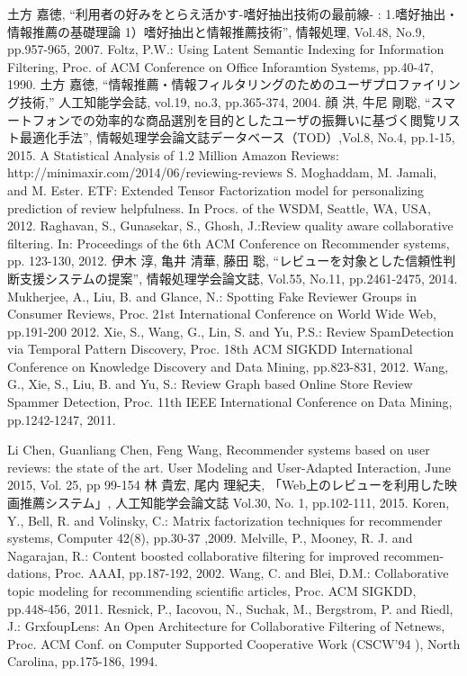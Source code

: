 \documentclass[a4paper,11pt,oneside,openany]{jsbook}
\begin{document}
\begin{thebibliography}{99}
	土方 嘉徳, “利用者の好みをとらえ活かす-嗜好抽出技術の最前線- : 1.嗜好抽出・情報推薦の基礎理論 1）嗜好抽出と情報推薦技術”, 情報処理, Vol.48, No.9, pp.957-965, 2007.
	Foltz, P.W.: Using Latent Semantic Indexing for Information Filtering, Proc. of ACM Conference on Office Inforamtion Systems, pp.40-47, 1990.
	土方 嘉徳, “情報推薦・情報フィルタリングのためのユーザプロファイリング技術,” 人工知能学会誌, vol.19, no.3, pp.365-374, 2004.
	顔 洪, 牛尼 剛聡, “スマートフォンでの効率的な商品選別を目的としたユーザの振舞いに基づく閲覧リスト最適化手法”, 情報処理学会論文誌データベース（TOD）,Vol.8, No.4, pp.1-15, 2015.
	A Statistical Analysis of 1.2 Million Amazon Reviews: http://minimaxir.com/2014/06/reviewing-reviews
        S. Moghaddam, M. Jamali, and M. Ester. ETF: Extended Tensor Factorization model for personalizing prediction of review helpfulness. In Procs. of the WSDM, Seattle, WA, USA, 2012. 
	Raghavan, S., Gunasekar, S., Ghosh, J.:Review quality aware collaborative filtering. In: Proceedings of the 6th ACM Conference on Recommender systems, pp. 123-130, 2012.
	伊木 淳, 亀井 清華, 藤田 聡, “レビューを対象とした信頼性判断支援システムの提案”, 情報処理学会論文誌, Vol.55, No.11, pp.2461-2475, 2014.
	Mukherjee, A., Liu, B. and Glance, N.: Spotting Fake Reviewer Groups in Consumer Reviews, Proc. 21st International Conference on World Wide Web, pp.191-200 2012.
	Xie, S., Wang, G., Lin, S. and Yu, P.S.: Review SpamDetection via Temporal Pattern Discovery, Proc. 18th ACM SIGKDD International Conference on Knowledge Discovery and Data Mining, pp.823-831, 2012.
	Wang, G., Xie, S., Liu, B. and Yu, S.: Review Graph based Online Store Review Spammer Detection, Proc. 11th IEEE International Conference on Data Mining, pp.1242-1247, 2011.
	
	Li Chen, Guanliang Chen, Feng Wang, Recommender systems based on user reviews: the state of the art. User Modeling and User-Adapted Interaction, June 2015, Vol. 25, pp 99-154
	林 貴宏, 尾内 理紀夫, 「Web上のレビューを利用した映画推薦システム」, 人工知能学会論文誌
Vol.30, No. 1, pp.102-111, 2015.
	Koren, Y., Bell, R. and Volinsky, C.: Matrix factorization techniques for recommender systems, Computer 42(8), pp.30-37 ,2009.
	Melville, P., Mooney, R. J. and Nagarajan, R.: Content boosted collaborative filtering for improved recommen- dations, Proc. AAAI, pp.187-192, 2002.
	Wang, C. and Blei, D.M.: Collaborative topic modeling for recommending scientific articles, Proc. ACM SIGKDD, pp.448-456, 2011.
	Resnick, P., Iacovou, N., Suchak, M., Bergstrom, P. and Riedl, J.: GrxfoupLens: An Open Architecture for Collaborative Filtering of Netnews, Proc. ACM Conf. on Computer Supported Cooperative Work (CSCW’94 ), North Carolina, pp.175-186, 1994.
	

\end{thebibliography}
\end{document}
